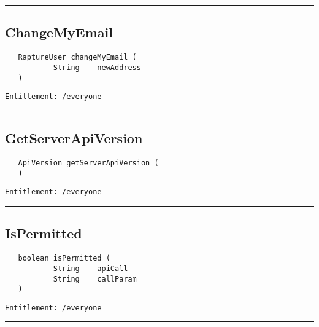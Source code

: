 \rule{12cm}{2pt}
\subsection{ChangeMyEmail}
\label{Api:ChangeMyEmail}
\begin{Verbatim}
   RaptureUser changeMyEmail (
           String    newAddress
   )
\end{Verbatim}
\begin{Verbatim}[formatcom=\color{Maroon}]
  Entitlement: /everyone
\end{Verbatim}



\rule{12cm}{2pt}
\subsection{GetServerApiVersion}
\label{Api:GetServerApiVersion}
\begin{Verbatim}
   ApiVersion getServerApiVersion (
   )
\end{Verbatim}
\begin{Verbatim}[formatcom=\color{Maroon}]
  Entitlement: /everyone
\end{Verbatim}



\rule{12cm}{2pt}
\subsection{IsPermitted}
\label{Api:IsPermitted}
\begin{Verbatim}
   boolean isPermitted (
           String    apiCall
           String    callParam
   )
\end{Verbatim}
\begin{Verbatim}[formatcom=\color{Maroon}]
  Entitlement: /everyone
\end{Verbatim}



\rule{12cm}{2pt}
